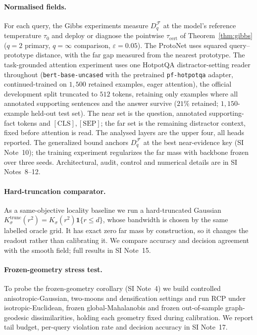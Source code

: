 \documentclass[10pt,twocolumn]{article}
\begin{document}
\paragraph{Normalised fields.} For each query, the Gibbs experiments measure $D_q^{\mathcal{F}}$ at the model's reference temperature $\tau_0$ and deploy or diagnose the pointwise $\tau_{\mathrm{cert}}$ of Theorem~\ref{thm:gibbs} ($q=2$ primary, $q=\infty$ comparison, $\varepsilon=0.05$). The ProtoNet uses squared query--prototype distance, with the far gap measured from the nearest prototype. The task-grounded attention experiment uses one HotpotQA distractor-setting reader throughout (\texttt{bert-base-uncased} with the pretrained \texttt{pf-hotpotqa} adapter, continued-trained on $1{,}500$ retained examples, eager attention), the official development split truncated to $512$ tokens, retaining only examples where all annotated supporting sentences and the answer survive ($21\%$ retained; $1{,}150$-example held-out test set). The near set is the question, annotated supporting-fact tokens and $[\mathrm{CLS}],[\mathrm{SEP}]$; the far set is the remaining distractor context, fixed before attention is read. The analysed layers are the upper four, all heads reported. The generalized bound anchors $D_q^{\mathcal{F}}$ at the best near-evidence key (SI Note~10); the training experiment regularizes the far mass with backbone frozen over three seeds. Architectural, audit, control and numerical details are in SI Notes~8--12.

\paragraph{Hard-truncation comparator.} As a same-objective locality baseline we run a hard-truncated Gaussian $K^{\mathrm{trunc}}_\sigma(r^2)=K_\sigma(r^2)\mathbf{1}\{r\le d\}$, whose bandwidth is chosen by the same labelled oracle grid. It has exact zero far mass by construction, so it changes the readout rather than calibrating it. We compare accuracy and decision agreement with the smooth field; full results in SI Note~15.

\paragraph{Frozen-geometry stress test.} To probe the frozen-geometry corollary (SI Note~4) we build controlled anisotropic-Gaussian, two-moons and densification settings and run RCP under isotropic-Euclidean, frozen global-Mahalanobis and frozen out-of-sample graph-geodesic dissimilarities, holding each geometry fixed during calibration. We report tail budget, per-query violation rate and decision accuracy in SI Note~17.
\end{document}
